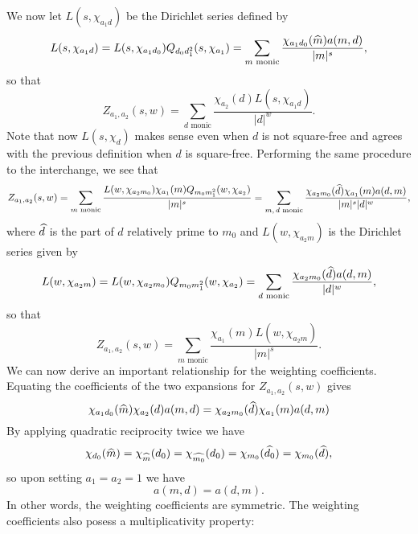 \documentclass[12pt,reqno,oneside]{amsart}
\begin{document}
    We now let $L(s,\chi_{a_{1}d})$ be the Dirichlet series defined by
    \[
        L(s,\chi_{a_{1}d}) = L(s,\chi_{a_{1}d_{0}})Q_{d_{0}d_{1}^{2}}(s,\chi_{a_{1}}) = \sum_{\text{$m$ monic}}\frac{\chi_{a_{1}d_{0}}(\widehat{m})a(m,d)}{|m|^{s}},
    \]
    so that
    \[
        Z_{a_{1},a_{2}}(s,w) = \sum_{\text{$d$ monic}}\frac{\chi_{a_{2}}(d)L(s,\chi_{a_{1}d})}{|d|^{w}}.
    \]
    Note that now $L(s,\chi_{d})$ makes sense even when $d$ is not square-free and agrees with the previous definition when $d$ is square-free. Performing the same procedure to the interchange, we see that
    \[
        Z_{a_{1},a_{2}}(s,w) = \sum_{\text{$m$ monic}}\frac{L(w,\chi_{a_{2}m_{0}})\chi_{a_{1}}(m)Q_{m_{0}m_{1}^{2}}(w,\chi_{a_{2}})}{|m|^{s}} = \sum_{\text{$m,d$ monic}}\frac{\chi_{a_{2}m_{0}}(\widehat{d})\chi_{a_{1}}(m)a(d,m)}{|m|^{s}|d|^{w}},
    \]
    where $\widehat{d}$ is the part of $d$ relatively prime to $m_{0}$ and $L(w,\chi_{a_{2}m})$ is the Dirichlet series given by
    \[
        L(w,\chi_{a_{2}m}) = L(w,\chi_{a_{2}m_{0}})Q_{m_{0}m_{1}^{2}}(w,\chi_{a_{2}}) = \sum_{\text{$d$ monic}}\frac{\chi_{a_{2}m_{0}}(\widehat{d})a(d,m)}{|d|^{w}},
    \]
    so that
    \[
        Z_{a_{1},a_{2}}(s,w) = \sum_{\text{$m$ monic}}\frac{\chi_{a_{1}}(m)L(w,\chi_{a_{2}m})}{|m|^{s}}.
    \]
    We can now derive an important relationship for the weighting coefficients. Equating the coefficients of the two expansions for $Z_{a_{1},a_{2}}(s,w)$ gives
    \[
        \chi_{a_{1}d_{0}}(\widehat{m})\chi_{a_{2}}(d)a(m,d) = \chi_{a_{2}m_{0}}(\widehat{d})\chi_{a_{1}}(m)a(d,m)
    \]
    By applying quadratic reciprocity twice we have
    \[
        \chi_{d_{0}}(\widehat{m}) = \chi_{\widehat{m}}(d_{0}) = \chi_{\widehat{m_{0}}}(d_{0}) = \chi_{m_{0}}(\widehat{d_{0}}) = \chi_{m_{0}}(\widehat{d}),
    \]
    so upon setting $a_{1} = a_{2} = 1$ we have
    \[
        a(m,d) = a(d,m).
    \]
    In other words, the weighting coefficients are symmetric. The weighting coefficients also posess a multiplicativity property:
\end{document}
